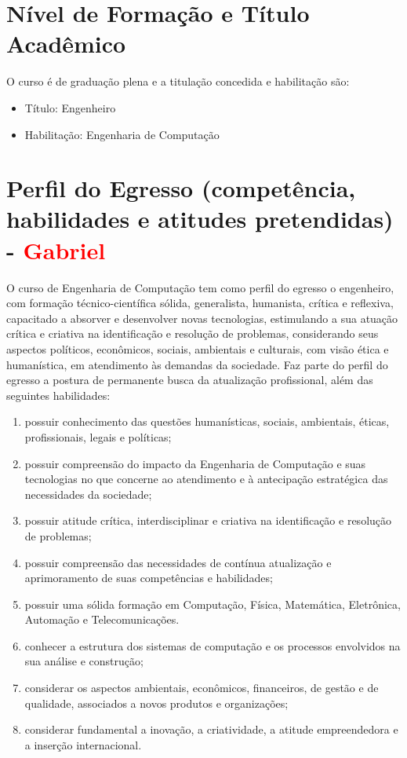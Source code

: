 \section{Nível de Formação e Título Acadêmico}

O curso é de graduação plena e a titulação concedida e habilitação são:

\begin{itemize}
\item{Título: Engenheiro}
\item{Habilitação: Engenharia de Computação}
\end{itemize}

\section{Perfil do Egresso (competência, habilidades e atitudes pretendidas) - \textcolor{red}{Gabriel}}

O curso de Engenharia de Computação tem como perfil do egresso o engenheiro, com formação técnico-científica sólida, generalista, humanista, crítica e reflexiva, capacitado a absorver e desenvolver novas tecnologias, estimulando a sua atuação crítica e criativa na identificação e resolução de problemas, considerando seus aspectos políticos, econômicos, sociais, ambientais e culturais, com visão ética e humanística, em atendimento às demandas da sociedade. Faz parte do perfil do egresso a postura de permanente busca da atualização profissional, além das seguintes habilidades:
\begin{enumerate} [I -]
	\item possuir conhecimento das questões humanísticas, sociais, ambientais, éticas, profissionais, legais e políticas;
	\item possuir compreensão do impacto da Engenharia de Computação e suas tecnologias no que concerne ao atendimento e à antecipação estratégica das necessidades da sociedade;
	\item possuir atitude crítica, interdisciplinar e criativa na identificação e resolução de problemas;
	\item possuir compreensão das necessidades de contínua atualização e aprimoramento de suas competências e habilidades;
	\item possuir uma sólida formação em Computação, Física, Matemática, Eletrônica, Automação e Telecomunicações.
	\item conhecer a estrutura dos sistemas de computação e os processos envolvidos na sua análise e construção;
	\item considerar os aspectos ambientais, econômicos, financeiros, de gestão e de qualidade, associados a novos produtos e organizações;
	\item considerar fundamental a inovação, a criatividade, a atitude empreendedora e a inserção internacional.
\end{enumerate}

